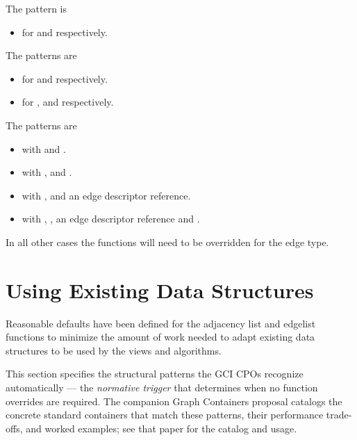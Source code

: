 The  pattern is
\begin{itemize}
    \item {} for  and  respectively.
\end{itemize}

The  patterns are
\begin{itemize}
    \item {} for  and  respectively.
    \item {} for ,  and  respectively.
\end{itemize}

The  patterns are
\begin{itemize}
    \item {} with  and .
    \item {} with ,  and .
    \item {} with ,  and an edge descriptor reference.
    \item {} with , , an edge descriptor reference and .
\end{itemize}

In all other cases the functions will need to be overridden for the edge type.

\section{Using Existing Data Structures}
Reasonable defaults have been defined for the adjacency list and edgelist functions to minimize the amount of work
needed to adapt existing data structures to be used by the views and algorithms.

This section specifies the structural patterns the GCI CPOs recognize automatically --- the
\emph{normative trigger} that determines when no function overrides are required. The
companion Graph Containers proposal catalogs the concrete standard containers that match these
patterns, their performance trade-offs, and worked examples; see that paper for the catalog and
usage.

